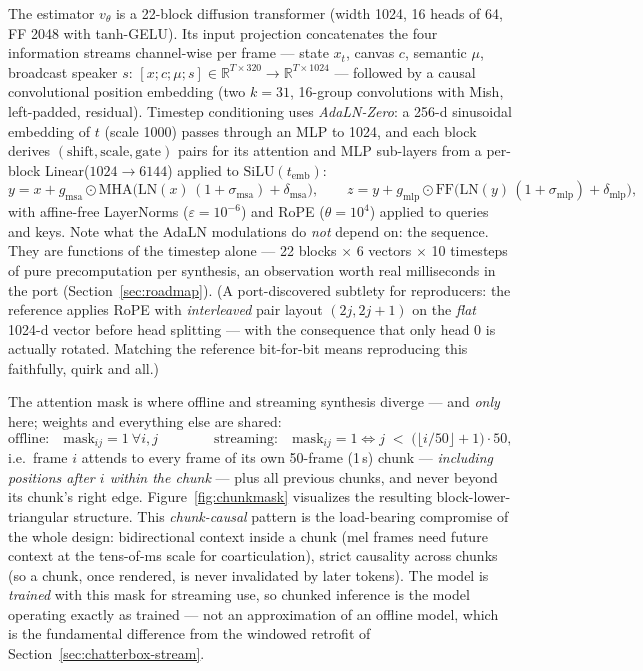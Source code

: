 \documentclass[11pt,a4paper]{article}
\newcommand{\vth}{\ensuremath{v_\theta}}
\newcommand{\R}{\mathbb{R}}
\begin{document}
The estimator $\vth$ is a 22-block diffusion transformer (width 1024, 16 heads of 64,
FF 2048 with tanh-GELU). Its input projection concatenates the four information streams
channel-wise per frame --- state $x_t$, canvas $c$, semantic $\mu$, broadcast speaker
$s$: $[x; c; \mu; s] \in \R^{T\times 320} \to \R^{T\times 1024}$ --- followed by a causal
convolutional position embedding (two $k{=}31$, 16-group convolutions with Mish,
left-padded, residual). Timestep conditioning uses \emph{AdaLN-Zero}: a 256-d sinusoidal
embedding of $t$ (scale 1000) passes through an MLP to 1024, and each block derives
$(\mathrm{shift}, \mathrm{scale}, \mathrm{gate})$ pairs for its attention and MLP
sub-layers from a per-block Linear($1024 \to 6144$) applied to $\mathrm{SiLU}(t_{\mathrm{emb}})$:
\begin{equation}
y = x + g_{\mathrm{msa}} \odot
\mathrm{MHA}\!\big( \mathrm{LN}(x)\,(1 + \sigma_{\mathrm{msa}}) + \delta_{\mathrm{msa}} \big),
\qquad
z = y + g_{\mathrm{mlp}} \odot
\mathrm{FF}\!\big( \mathrm{LN}(y)\,(1 + \sigma_{\mathrm{mlp}}) + \delta_{\mathrm{mlp}} \big),
\label{eq:adaln-zero}
\end{equation}
with affine-free LayerNorms ($\varepsilon = 10^{-6}$) and RoPE ($\theta = 10^4$) applied
to queries and keys. Note what the AdaLN modulations do \emph{not} depend on: the
sequence. They are functions of the timestep alone --- 22 blocks $\times$ 6 vectors
$\times$ 10 timesteps of pure precomputation per synthesis, an observation worth real
milliseconds in the port (Section~\ref{sec:roadmap}). (A port-discovered subtlety for
reproducers: the reference applies RoPE with \emph{interleaved} pair layout
$(2j, 2j{+}1)$ on the \emph{flat} 1024-d vector before head splitting --- with the
consequence that only head 0 is actually rotated. Matching the reference bit-for-bit
means reproducing this faithfully, quirk and all.)

The attention mask is where offline and streaming synthesis diverge --- and
\emph{only} here; weights and everything else are shared:
\begin{equation}
\text{offline:}\quad \mathrm{mask}_{ij} = 1\ \forall i,j
\qquad\qquad
\text{streaming:}\quad \mathrm{mask}_{ij} = 1 \iff
j \;<\; \Big( \big\lfloor i / 50 \big\rfloor + 1 \Big) \cdot 50 ,
\label{eq:chunk-mask}
\end{equation}
i.e.\ frame $i$ attends to every frame of its own 50-frame (1\,s) chunk ---
\emph{including positions after $i$ within the chunk} --- plus all previous chunks, and
never beyond its chunk's right edge. Figure~\ref{fig:chunkmask} visualizes the resulting
block-lower-triangular structure. This \emph{chunk-causal} pattern is the load-bearing
compromise of the whole design: bidirectional context inside a chunk (mel frames need
future context at the tens-of-ms scale for coarticulation), strict causality across
chunks (so a chunk, once rendered, is never invalidated by later tokens). The
model is \emph{trained} with this mask for streaming use, so chunked inference is the
model operating exactly as trained --- not an approximation of an offline model, which
is the fundamental difference from the windowed retrofit of
Section~\ref{sec:chatterbox-stream}.
\end{document}
